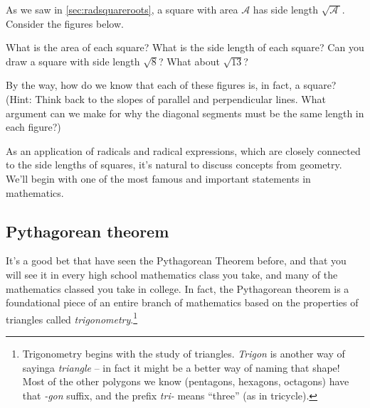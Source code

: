 \begin{boxedexplore}
As we saw in \cref{sec:radsquareroots}, a square with area $\mathcal{A}$ has side length $\sqrt{\!\mathcal{A}\,}$. Consider the figures below.

\begin{center}
\end{center}

What is the area of each square? What is the side length of each square? Can you draw a square with side length $\sqrt{8}$? What about $\sqrt{13}$?

By the way, how do we know that each of these figures is, in fact, a square? (Hint: Think back to the slopes of parallel and perpendicular lines. What argument can we make for why the diagonal segments must be the same length in each figure?)
\end{boxedexplore}

As an application of radicals and radical expressions, which are closely connected to the side lengths of squares, it's natural to discuss concepts from geometry. We'll begin with one of the most famous and important statements in mathematics.

\subsection{{P}ythagorean theorem}

It's a good bet that have seen the Pythagorean Theorem before, and that you will see it in every high school mathematics class you take, and many of the mathematics classed you take in college. In fact, the Pythagorean theorem is a foundational piece of an entire branch of mathematics based on the properties of triangles called \textit{trigonometry}.\footnote{Trigonometry begins with the study of triangles. \textit{Trigon} is another way of sayinga \textit{triangle} -- in fact it might be a better way of naming that shape! Most of the other polygons we know (pentagons, hexagons, octagons) have that \textit{-gon} suffix, and the prefix \textit{tri-} means ``three'' (as in tricycle).}

